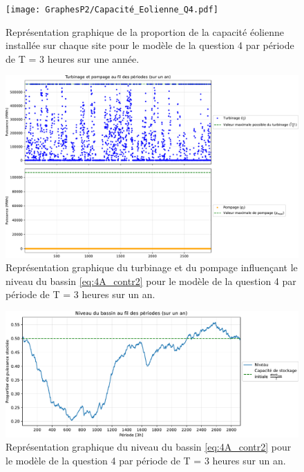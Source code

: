 \documentclass{article}
\begin{document}
\begin{figure}[h!]
    \centering
    \texttt{[image: GraphesP2/Capacité\_Eolienne\_Q4.pdf]}
    \caption{Représentation graphique de la proportion de la capacité éolienne installée sur chaque site pour le modèle de la question 4 par période
    de T = 3 heures sur une année.}
    \label{fig:Capacité_Eolienne_Q4}
\end{figure}

\begin{figure}[h!]
    \centering
    \includegraphics[scale=0.6]{GraphesP2/Turbinage_pompage_Q4.pdf}
    \caption{Représentation graphique du turbinage et du pompage
    influençant le niveau du bassin \eqref{eq:4A_contr2} pour le modèle de la question 4 par période de T = 3 heures sur un an.}
    \label{fig:Turbinage_pompage_Q4}
\end{figure}

\begin{figure}[h!]
    \centering
    \includegraphics[scale=0.6]{GraphesP2/Niveau_Bassin_Q4.pdf}
    \caption{Représentation graphique du niveau du bassin \eqref{eq:4A_contr2} pour le modèle 
    de la question 4 par période de T = 3 heures sur un an.}
    \label{fig:Niveau_bassin_Q4}
\end{figure}
\end{document}
